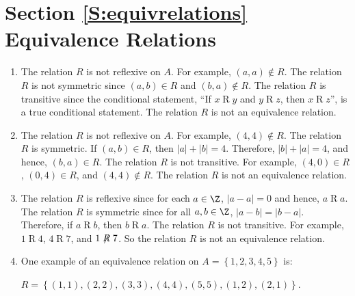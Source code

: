 \section*{Section \ref{S:equivrelations} Equivalence Relations}

\begin{enumerate} 
\item The relation $R$ is not reflexive on $A$.  For example, $\left( a, a \right) \notin R$.
The relation $R$ is not symmetric since $\left( a, b \right) \in R$ and 
$\left( b, a \right) \notin R$.  
The relation $R$ is transitive since the conditional statement, ``If $x \mathrel{R} y$ and $y \mathrel{R} z$, then $x \mathrel{R} z$'', is a true conditional statement.
The relation $R$ is not an equivalence relation.



\item The relation $R$ is not reflexive on $A$.  For example, $\left( 4, 4 \right) \notin R$.
The relation $R$ is symmetric.  If $\left( a, b \right) \in R$, then 
$\left| a \right| + \left| b \right| = 4$.  Therefore, $\left| b \right| + \left| a \right| = 4$, and hence, $\left( b, a \right) \in R$.
The relation $R$ is not transitive.  For example, $\left( 4, 0 \right) \in R$, 
$\left( 0, 4 \right) \in R$, and $\left( 4, 4 \right) \notin R$.
The relation $R$ is not an equivalence relation.


\item The relation $R$ is reflexive since for each $a \in \Z$, $|a - a| = 0$ and hence, 
$a \mathrel{R} a$.  The relation $R$ is symmetric since for all $a, b \in \Z$, 
$|a - b| = |b - a|$.   Therefore, if $a \mathrel{R} b$, then $b \mathrel{R} a$.  The relation $R$ is not transitive.  For example, $1 \mathrel{R} 4$, $4 \mathrel{R} 7$, and 
$1 \mathrel{\not \negthickspace R} 7$.  So the relation $R$ is not an equivalence relation.




\item One example of an equivalence relation on $A =\left\{ 1, 2, 3, 4, 5 \right\}$ is: 

$R = \left\{ \left( 1, 1 \right), \left( 2, 2 \right), \left( 3, 3 \right), \left( 4, 4 \right), \left( 5, 5 \right), \left( 1, 2 \right), \left( 2, 1 \right) \right\}$.



\end{enumerate}
